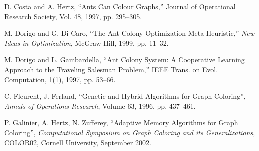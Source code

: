 \documentclass[11pt]{article}
\begin{document}
\begin{thebibliography}{99}


D. Costa and A. Hertz,
``Ants Can Colour Graphs,''
Journal of Operational Research Society,  Vol. 48, 1997, pp. 295--305.


M. Dorigo and G. Di Caro,
``The Ant Colony Optimization Meta-Heuristic,''
{\it New Ideas in Optimization}, McGraw-Hill, 1999, pp. 11--32.


M. Dorigo and L. Gambardella,
``Ant Colony System: A Cooperative Learning Approach to the Traveling
Salesman Problem,''
IEEE Trans. on Evol. Computation, 1(1), 1997, pp. 53--66.

C. Fleurent, J. Ferland,
``Genetic and Hybrid Algorithms for Graph Coloring'',
{\it Annals of Operations Research}, Volume 63, 1996, pp. 437--461.

P. Galinier, A. Hertz, N. Zufferey,
``Adaptive Memory Algorithms for Graph Coloring'',
{\it Computational Symposium on Graph Coloring and its Generalizations}, 
COLOR02,
Cornell University, September 2002.






\end{thebibliography}
\end{document}
